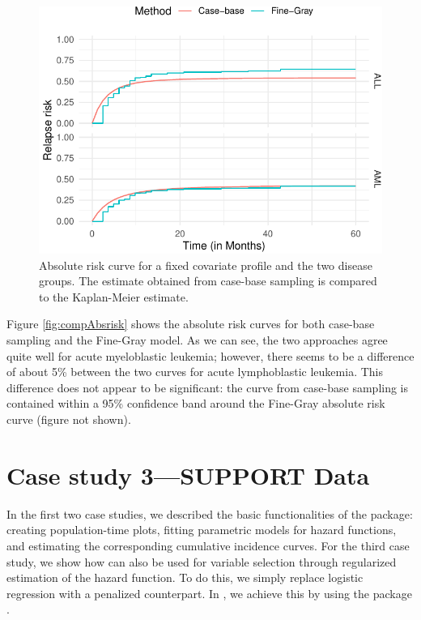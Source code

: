 \documentclass[
]{jss}
\begin{document}
\begin{CodeChunk}
\begin{figure}

{\centering \includegraphics{../figures/bmtcrr-risk-1} 

}

\caption{\label{fig:compAbsrisk} Absolute risk curve for a fixed covariate profile and the two disease groups. The estimate obtained from case-base sampling is compared to the Kaplan-Meier estimate.}\label{fig:bmtcrr-risk}
\end{figure}
\end{CodeChunk}

Figure \ref{fig:compAbsrisk} shows the absolute risk curves for both
case-base sampling and the Fine-Gray model. As we can see, the two
approaches agree quite well for acute myeloblastic leukemia; however,
there seems to be a difference of about 5\% between the two curves for
acute lymphoblastic leukemia. This difference does not appear to be
significant: the curve from case-base sampling is contained within a
95\% confidence band around the Fine-Gray absolute risk curve (figure
not shown).

\hypertarget{case-study-3support-data}{%
\section{Case study 3---SUPPORT Data}\label{case-study-3support-data}}

In the first two case studies, we described the basic functionalities of
the  package: creating population-time plots, fitting
parametric models for hazard functions, and estimating the corresponding
cumulative incidence curves. For the third case study, we show how
 can also be used for variable selection through
regularized estimation of the hazard function. To do this, we simply
replace logistic regression with a penalized counterpart. In
, we achieve this by using the  package
\citep{friedman2010jss}.
\end{document}
